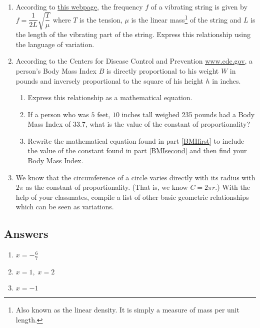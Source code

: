 \begin{enumerate}
\setcounter{enumi}{\value{HW}}

\item According to \href{http://en.wikipedia.org/wiki/Vibrating_string}{\underline{this webpage}}, the frequency $f$ of a vibrating string is given by $f = \dfrac{1}{2L} \sqrt{\dfrac{T}{\mu}}$ where $T$ is the tension, $\mu$ is the linear mass\footnote{Also known as the linear density.  It is simply a measure of mass per unit length.} of the string and $L$ is the length of the vibrating part of the string.  Express this relationship using the language of variation.

\item According to the Centers for Disease Control and Prevention \href{http://www.cdc.gov}{\underline{www.cdc.gov}}, a person's Body Mass Index $B$ is directly proportional to his weight $W$ in pounds and inversely proportional to the square of his height $h$ in inches. 

\begin{enumerate}

\item Express this relationship as a mathematical equation. \label{BMIfirst} 
\item If a person who was $5$ feet, $10$ inches tall weighed 235 pounds had a Body Mass Index of 33.7, what is the value of the constant of proportionality? \label{BMIsecond}
\item Rewrite the mathematical equation found in part \ref{BMIfirst} to include the value of the constant found in part \ref{BMIsecond} and then find your Body Mass Index.

\end{enumerate}

\item We know that the circumference of a circle varies directly with its radius with $2\pi$ as the constant of proportionality. (That is, we know $C = 2\pi r.$)  With the help of your classmates, compile a list of other basic geometric relationships which can be seen as variations.

\end{enumerate}

\newpage

\subsection{Answers}

\begin{multicols}{3} 
\begin{enumerate}

\item $x = -\frac{6}{7}$
\item $x = 1, \; x = 2$
\item $x = -1$

\setcounter{HW}{\value{enumi}}
\end{enumerate}
\end{multicols}


